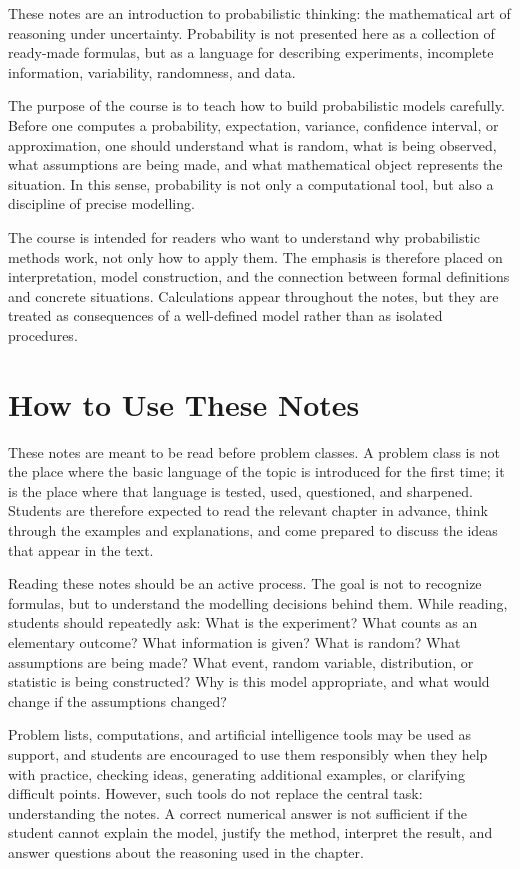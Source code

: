 These notes are an introduction to probabilistic thinking: the mathematical art of reasoning under uncertainty. Probability is not presented here as a collection of ready-made formulas, but as a language for describing experiments, incomplete information, variability, randomness, and data.

The purpose of the course is to teach how to build probabilistic models carefully. Before one computes a probability, expectation, variance, confidence interval, or approximation, one should understand what is random, what is being observed, what assumptions are being made, and what mathematical object represents the situation. In this sense, probability is not only a computational tool, but also a discipline of precise modelling.

The course is intended for readers who want to understand why probabilistic methods work, not only how to apply them. The emphasis is therefore placed on interpretation, model construction, and the connection between formal definitions and concrete situations. Calculations appear throughout the notes, but they are treated as consequences of a well-defined model rather than as isolated procedures.

\section{How to Use These Notes}

These notes are meant to be read before problem classes. A problem class is not the place where the basic language of the topic is introduced for the first time; it is the place where that language is tested, used, questioned, and sharpened. Students are therefore expected to read the relevant chapter in advance, think through the examples and explanations, and come prepared to discuss the ideas that appear in the text.

Reading these notes should be an active process. The goal is not to recognize formulas, but to understand the modelling decisions behind them. While reading, students should repeatedly ask: What is the experiment? What counts as an elementary outcome? What information is given? What is random? What assumptions are being made? What event, random variable, distribution, or statistic is being constructed? Why is this model appropriate, and what would change if the assumptions changed?

Problem lists, computations, and artificial intelligence tools may be used as support, and students are encouraged to use them responsibly when they help with practice, checking ideas, generating additional examples, or clarifying difficult points. However, such tools do not replace the central task: understanding the notes. A correct numerical answer is not sufficient if the student cannot explain the model, justify the method, interpret the result, and answer questions about the reasoning used in the chapter.

